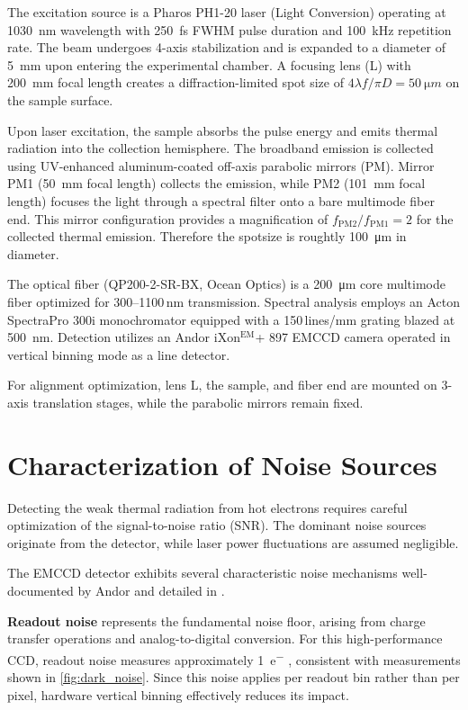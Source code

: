 \documentclass[
	parskip=half,
	a4paper,
]{scrarticle}
\begin{document}
The excitation source is a Pharos PH1-20 laser (Light Conversion) operating at \SI{1030}{nm} wavelength with \SI{250}{fs} FWHM pulse duration and \SI{100}{kHz} repetition rate. The beam undergoes 4-axis stabilization and is expanded to a diameter of \SI{5}{mm} upon entering the experimental chamber. A focusing lens (L) with \SI{200}{mm} focal length creates a diffraction-limited spot size of $4\lambda f / \pi D = \SI{50}{\micro m}$ on the sample surface.

Upon laser excitation, the sample absorbs the pulse energy and emits thermal radiation into the collection hemisphere. The broadband emission is collected using UV-enhanced aluminum-coated off-axis parabolic mirrors (PM). Mirror PM1 (\SI{50}{mm} focal length) collects the emission, while PM2 (\SI{101}{mm} focal length) focuses the light through a spectral filter onto a bare multimode fiber end.
This mirror configuration provides a magnification of $f_\text{PM2}/f_\text{PM1} = 2$ for the collected thermal emission. Therefore the spotsize is roughtly \SI{100}{\micro m} in diameter.

The optical fiber (QP200-2-SR-BX, Ocean Optics) is a \SI{200}{\micro m} core multimode fiber optimized for 300--1100\,nm transmission. Spectral analysis employs an Acton SpectraPro 300i monochromator equipped with a 150\,lines/mm grating blazed at \SI{500}{nm}. Detection utilizes an Andor iXon$^\text{EM}$+ 897 EMCCD camera operated in vertical binning mode as a line detector.

For alignment optimization, lens L, the sample, and fiber end are mounted on 3-axis translation stages, while the parabolic mirrors remain fixed.

\section{Characterization of Noise Sources}

Detecting the weak thermal radiation from hot electrons requires careful optimization of the signal-to-noise ratio (SNR). The dominant noise sources originate from the detector, while laser power fluctuations are assumed negligible.

The EMCCD detector exhibits several characteristic noise mechanisms well-documented by Andor \cite{andor_establishing_nodate,dr_jo_walters_sensitivity_2023} and detailed in \cite{european_machine_vision_association_standard_2010}.

\textbf{Readout noise} represents the fundamental noise floor, arising from charge transfer operations and analog-to-digital conversion. For this high-performance CCD, readout noise measures approximately \SI{1}{e^-} \cite{andor_ixonem_nodate}, consistent with measurements shown in \autoref{fig:dark_noise}. Since this noise applies per readout bin rather than per pixel, hardware vertical binning effectively reduces its impact.
\end{document}
